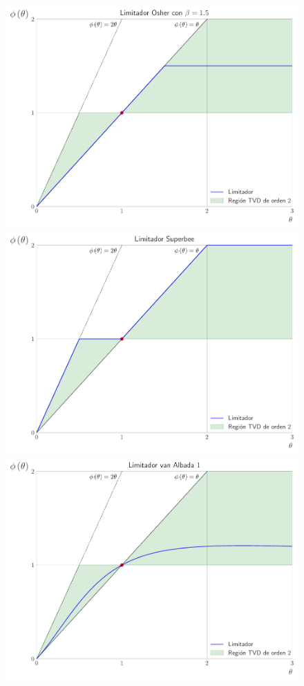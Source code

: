 \begin{figure}[ht!]
	\includegraphics[width=.28\paperwidth]{limiters/limiterosher}
	\includegraphics[width=.28\paperwidth]{limiters/limitersuperbee}
	\includegraphics[width=.28\paperwidth]{limiters/limitervanalbada1}

\end{figure}
